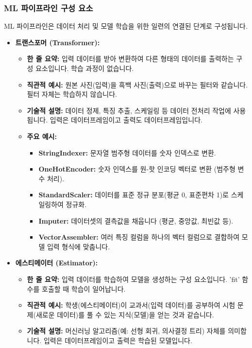 \documentclass[11pt,a4paper]{article}
\begin{document}
\subsubsection*{ML 파이프라인 구성 요소}
ML 파이프라인은 데이터 처리 및 모델 학습을 위한 일련의 연결된 단계로 구성됩니다.
\begin{itemize}
    \item \textbf{트랜스포머 (Transformer):}
    \begin{itemize}
        \item \textbf{한 줄 요약:} 입력 데이터를 받아 변환하여 다른 형태의 데이터를 출력하는 구성 요소입니다. 학습 과정이 없습니다.
        \item \textbf{직관적 예시:} 원본 사진(입력)을 흑백 사진(출력)으로 바꾸는 필터와 같습니다. 필터 자체는 학습하지 않습니다.
        \item \textbf{기술적 설명:} 데이터 정제, 특징 추출, 스케일링 등 데이터 전처리 작업에 사용됩니다. 입력은 데이터프레임이고 출력도 데이터프레임입니다.
        \item \textbf{주요 예시:}
        \begin{itemize}
            \item \textbf{StringIndexer:} 문자열 범주형 데이터를 숫자 인덱스로 변환.
            \item \textbf{OneHotEncoder:} 숫자 인덱스를 원-핫 인코딩 벡터로 변환 (범주형 변수 처리).
            \item \textbf{StandardScaler:} 데이터를 표준 정규 분포(평균 0, 표준편차 1)로 스케일링하여 정규화.
            \item \textbf{Imputer:} 데이터셋의 결측값을 채웁니다 (평균, 중앙값, 최빈값 등).
            \item \textbf{VectorAssembler:} 여러 특징 컬럼을 하나의 벡터 컬럼으로 결합하여 모델 입력 형식에 맞춥니다.
        \end{itemize}
    \end{itemize}
    \item \textbf{에스티메이터 (Estimator):}
    \begin{itemize}
        \item \textbf{한 줄 요약:} 입력 데이터를 학습하여 모델을 생성하는 구성 요소입니다. 'fit' 함수를 호출할 때 학습이 일어납니다.
        \item \textbf{직관적 예시:} 학생(에스티메이터)이 교과서(입력 데이터)를 공부하여 시험 문제(새로운 데이터)를 풀 수 있는 지식(모델)을 얻는 것과 같습니다.
        \item \textbf{기술적 설명:} 머신러닝 알고리즘(예: 선형 회귀, 의사결정 트리) 자체를 의미합니다. 입력은 데이터프레임이고 출력은 학습된 모델입니다.

\end{itemize}
\end{itemize}
\end{document}

